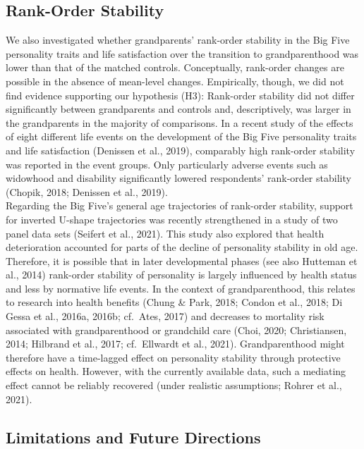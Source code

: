 \documentclass[
  english,
  man, noextraspace,floatsintext]{apa7}
\begin{document}
\hypertarget{rank-order-stability-1}{%
\subsection{Rank-Order Stability}\label{rank-order-stability-1}}

We also investigated whether grandparents' rank-order stability in the Big Five personality traits and life satisfaction over the transition to grandparenthood was lower than that of the matched controls. Conceptually, rank-order changes are possible in the absence of mean-level changes. Empirically, though, we did not find evidence supporting our hypothesis (H3): Rank-order stability did not differ significantly between grandparents and controls and, descriptively, was larger in the grandparents in the majority of comparisons. In a recent study of the effects of eight different life events on the development of the Big Five personality traits and life satisfaction (Denissen et al., 2019), comparably high rank-order stability was reported in the event groups. Only particularly adverse events such as widowhood and disability significantly lowered respondents' rank-order stability (Chopik, 2018; Denissen et al., 2019).\\
Regarding the Big Five's general age trajectories of rank-order stability, support for inverted U-shape trajectories was recently strengthened in a study of two panel data sets (Seifert et al., 2021). This study also explored that health deterioration accounted for parts of the decline of personality stability in old age. Therefore, it is possible that in later developmental phases (see also Hutteman et al., 2014) rank-order stability of personality is largely influenced by health status and less by normative life events. In the context of grandparenthood, this relates to research into health benefits (Chung \& Park, 2018; Condon et al., 2018; Di Gessa et al., 2016a, 2016b; cf.~Ates, 2017) and decreases to mortality risk associated with grandparenthood or grandchild care (Choi, 2020; Christiansen, 2014; Hilbrand et al., 2017; cf.~Ellwardt et al., 2021). Grandparenthood might therefore have a time-lagged effect on personality stability through protective effects on health. However, with the currently available data, such a mediating effect cannot be reliably recovered (under realistic assumptions; Rohrer et al., 2021).

\hypertarget{limitations-and-future-directions}{%
\subsection{Limitations and Future Directions}\label{limitations-and-future-directions}}
\end{document}
